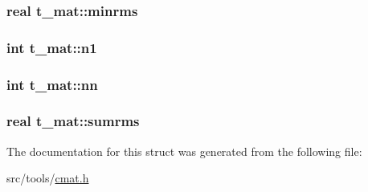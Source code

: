 \hypertarget{structt__mat_a508915b9f705577e9b0073b65570b7af}{
\subsubsection[{minrms}]{\setlength{\rightskip}{0pt plus 5cm}real {\bf t\-\_\-mat\-::minrms}}}\label{structt__mat_a508915b9f705577e9b0073b65570b7af}
\hypertarget{structt__mat_aa2137cd71b7befd7169853f448a1d21e}{
\subsubsection[{n1}]{\setlength{\rightskip}{0pt plus 5cm}int {\bf t\-\_\-mat\-::n1}}}\label{structt__mat_aa2137cd71b7befd7169853f448a1d21e}
\hypertarget{structt__mat_a5109af62855a77c226913e0bc069fb69}{
\subsubsection[{nn}]{\setlength{\rightskip}{0pt plus 5cm}int {\bf t\-\_\-mat\-::nn}}}\label{structt__mat_a5109af62855a77c226913e0bc069fb69}
\hypertarget{structt__mat_ad2f6e17820e1417a2426d79ccefa7733}{
\subsubsection[{sumrms}]{\setlength{\rightskip}{0pt plus 5cm}real {\bf t\-\_\-mat\-::sumrms}}}\label{structt__mat_ad2f6e17820e1417a2426d79ccefa7733}


\-The documentation for this struct was generated from the following file\-:\begin{DoxyCompactItemize}
\item 
src/tools/\hyperlink{cmat_8h}{cmat.\-h}\end{DoxyCompactItemize}
